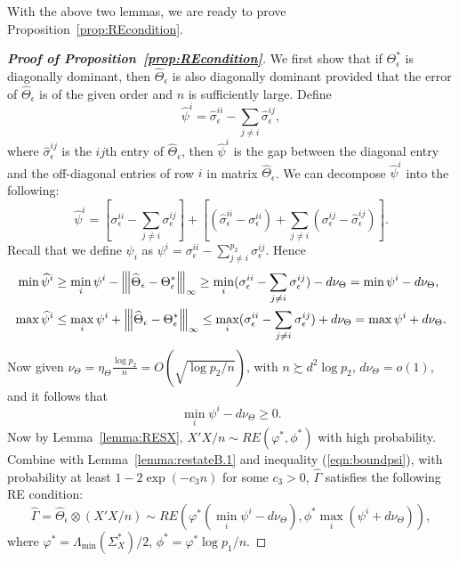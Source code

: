 \medskip

With the above two lemmas, we are ready to prove Proposition~\ref{prop:REcondition}. 

\begin{proof}[\textbf{Proof of Proposition~\ref{prop:REcondition}}]
We first show that if $\Theta^*_\epsilon$ is diagonally dominant, then $\widehat{\Theta}_\epsilon$ is also diagonally dominant provided that the error of $\widehat{\Theta}_\epsilon$ is of the given order and $n$ is sufficiently large. Define 
\begin{equation*}
\widehat{\psi}^i = \widehat{\sigma}_\epsilon^{ii} - \sum\limits_{j\neq i}\widehat{\sigma}_\epsilon^{ij},
\end{equation*}
where $\widehat{\sigma}_\epsilon^{ij}$ is the $ij$th entry of $\widehat{\Theta}_\epsilon$, then $\widehat{\psi}^i$ is the gap between the diagonal entry and the off-diagonal entries of row $i$ in matrix $\widehat{\Theta}_\epsilon$. We can decompose $\widehat{\psi}^i$ into the following:
\begin{equation*}
\widehat{\psi}^i = \left[\sigma^{ii}_\epsilon - \sum\limits_{j\neq i}\sigma^{ij}_\epsilon\right] + \left[ (\widehat{\sigma}^{ii}_\epsilon - \sigma^{ii}_\epsilon) + \sum\limits_{j\neq i} (\sigma^{ij}_\epsilon - \widehat{\sigma}^{ij}_\epsilon)\right].
\end{equation*}
Recall that we define $\psi_i$ as $\psi^i=\sigma_\epsilon^{ii}-\sum_{j\neq i}^{p_2}\sigma_\epsilon^{ij}$. Hence
\begin{equation}\label{eqn:boundpsi}
\begin{split}
\min\widehat{\psi}^i& \geq \min_i \psi^i - {\left\vert\kern-0.25ex\left\vert\kern-0.25ex\left\vert \widehat{\Theta}_\epsilon-\Theta_\epsilon^* \right\vert\kern-0.25ex\right\vert\kern-0.25ex\right\vert}_\infty \geq \min_i (\sigma_\epsilon^{ii} - \sum_{j\neq i}\sigma^{ij}_\epsilon) - d\nu_\Theta = \min\psi^i - d\nu_\Theta,\\
\max\widehat{\psi}^i& \leq \max_i \psi^i + {\left\vert\kern-0.25ex\left\vert\kern-0.25ex\left\vert \widehat{\Theta}_\epsilon-\Theta_\epsilon^* \right\vert\kern-0.25ex\right\vert\kern-0.25ex\right\vert}_\infty \leq \max_i (\sigma_\epsilon^{ii} - \sum_{j\neq i}\sigma^{ij}_\epsilon) + d\nu_\Theta = \max\psi^i + d\nu_\Theta.
\end{split}
\end{equation}
Now given $\nu_\Theta = \eta_\Theta\frac{\log p_2}{n} = O(\sqrt{\log p_2/n})$, with $n\succsim d^2\log p_2$, $d\nu_\Theta=o(1)$, and it follows that
\begin{equation*}
\min\limits_i \psi^i - d\nu_\Theta \geq 0.
\end{equation*}
Now by Lemma~\ref{lemma:RESX}, $X'X/n\sim RE(\varphi^*,\phi^*)$ with high probability. Combine with Lemma~\ref{lemma:restateB.1} and inequality (\ref{eqn:boundpsi}), with probability at least $1-2\exp(-c_3n)$ for some  $c_3>0$,  $\widehat{\Gamma}$ satisfies the following RE condition:
\begin{equation}
\widehat{\Gamma} = \widehat{\Theta}_\epsilon\otimes (X'X/n)\sim RE\left(\varphi^* (\min_i\psi^i-d\nu_\Theta), \phi^* \max\limits_i(\psi^i+d\nu_\Theta)\right),
\end{equation}
where $\varphi^*=\Lambda_{\min}(\Sigma^*_X)/2$, $\phi^*=\varphi^*\log p_1/n$.
\end{proof}


